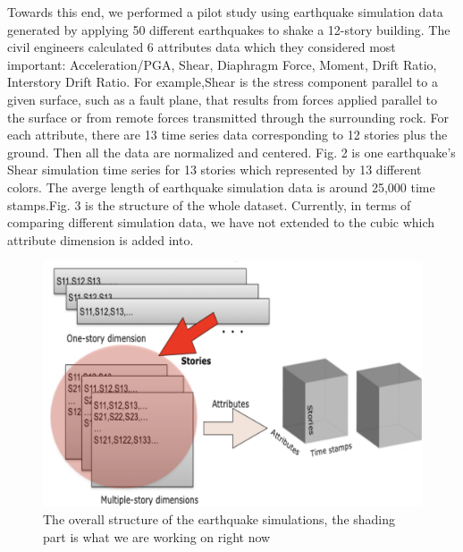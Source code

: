 Towards this end, we performed a pilot study using  earthquake simulation data generated by applying 50 different earthquakes to shake a 12-story building. The civil engineers calculated 6 attributes data which they considered most important: Acceleration/PGA, Shear, Diaphragm Force, Moment, Drift Ratio, Interstory Drift Ratio. For example,Shear is the stress component parallel to a given surface, such as a fault plane, that results from forces applied parallel to the surface or from remote forces transmitted through the surrounding rock. For each attribute, there are 13 time series data corresponding to 12 stories plus the ground. Then all the data are normalized and centered. Fig. 2 is one earthquake's Shear simulation time series for 13 stories which represented by 13 different colors.  The averge length of earthquake simulation data is around 25,000 time stamps.Fig. 3 is the structure of the whole dataset. Currently, in terms of comparing different simulation data, we have not extended to the cubic  which attribute dimension is added into.
\begin{figure}[h]
	\centering %
	\includegraphics[width=\columnwidth]{figs/structure} 
	\caption{The overall structure of the earthquake simulations, the shading part is what we are working on right now}
	\label{fig:data}
\end{figure}


